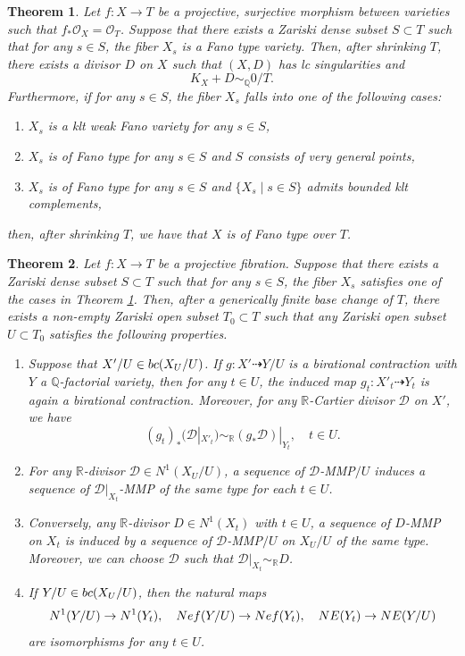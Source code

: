 \documentclass[10pt,a4paper]{amsart}
\newtheorem{theorem}{Theorem}
\newcommand{\NE}{{\rm {NE}}}
\newcommand{\Nef}{{\rm {Nef}}}
\newcommand{\bQ}{\mathbb{Q}}
\newcommand{\bR}{\mathbb{R}}
\newcommand{\bc}{{\rm {bc}}}
\newcommand{\mD}{\mathcal{D}}
\newcommand{\mO}{\mathcal{O}}
\begin{document}
\begin{theorem}\label{thm: FT is constructible}
Let $f: X \to T$ be a projective, surjective morphism between varieties such that $f_*\mO_X=\mO_T$. Suppose that there exists a Zariski dense subset $S\subset T$ such that for any $s\in S$, the fiber $X_s$ is a Fano type variety. Then, after shrinking $T$, there exists a divisor $D$ on $X$ such that $(X, D)$ has lc singularities and
\[
K_X+D \sim_\bQ 0/T.
\] Furthermore, if for any $s\in S$, the fiber $X_s$ falls into one of the following cases:
\begin{enumerate}[label=(\roman*)]
\item $X_s$ is a klt weak Fano variety for any $s\in S$,
\item $X_s$ is of Fano type for any $s\in S$ and $S$ consists of very general points,
\item $X_s$ is of Fano type for any $s\in S$ and $\{X_s \mid s\in S\}$ admits bounded klt complements,
\end{enumerate}
then, after shrinking $T$, we have that $X$ is of Fano type over $T$.
\end{theorem}

\begin{theorem}\label{mainthm: mmp}
Let $f: X \to T$ be a projective fibration. Suppose that there exists a Zariski dense subset $S\subset T$ such that for any $s\in S$, the fiber $X_s$ satisfies one of the cases in Theorem \ref{thm: FT is constructible}. Then, after a generically finite base change of $T$, there exists a non-empty Zariski open subset $T_0 \subset T$ such that any Zariski open subset $U \subset T_0$ satisfies the following properties.
\begin{enumerate}
\item Suppose that $X'/U \in \bc(X_U/U)$. If $g: X' \dashrightarrow Y/U$ is a birational contraction with $Y$ a $\bQ$-factorial variety, then for any $t \in U$, the induced map $g_t: X'_t \dashrightarrow Y_t$ is again a birational contraction. Moreover, for any $\bR$-Cartier divisor $\mD$ on $X'$, we have
\[
(g_t)_*(\mD|_{X'_t}) \sim_{\bR} (g_*\mD)|_{Y_t}, \quad t \in U.
\]
\item For any $\bR$-divisor $\mD\in N^1(X_U/U)$, a sequence of $\mD$-MMP$/U$ induces a sequence of $\mD|_{X_t}$-MMP of the same type for each $t\in U$. 
\item Conversely, any $\bR$-divisor $D\in N^1(X_t)$ with $t\in U$, a sequence of $D$-MMP on $X_t$ is induced by a sequence of $\mD$-MMP$/U$ on $X_U/U$ of the same type. Moreover, we can choose $\mD$ such that $\mD|_{X_t}\sim_\bR D$. 
\item If $Y/U\in \bc(X_{U}/U)$, then the natural maps
\[
N^1(Y/U) \to N^1(Y_t), \quad \Nef(Y/U) \to \Nef(Y_t), \quad \NE(Y_t) \to \NE(Y/U)
\] are isomorphisms for any $t\in U$.
\end{enumerate}
\end{theorem} 
\end{document}
